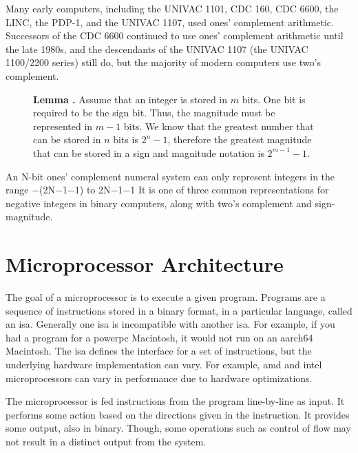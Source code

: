 \documentclass[letterpaper, 12pt]{book}
\newcommand*{\lemma}[1]{\noindent
    \colorbox{green!10}{\noindent
        \begin{minipage}{\textwidth}
            \textbf{Lemma \thechapter.\arabic{examples}}\stepcounter{lemma}
            #1
        \end{minipage}
    }
}
\begin{document}
Many early computers, including the UNIVAC 1101, CDC 160, CDC 6600, the LINC, the PDP-1, and the UNIVAC 1107, used ones' 
complement arithmetic. Successors of the CDC 6600 continued to use ones' complement arithmetic until the late 1980s, and 
the descendants of the UNIVAC 1107 (the UNIVAC 1100/2200 series) still do, but the majority of modern computers use two's 
complement. 

\begin{figure}[ht]
    \lemma{%
        Assume that an integer is stored in $m$ bits. One bit is required to be the sign bit. Thus, the magnitude %
        must be represented in $m - 1$ bits. We know that the greatest number that can be stored in $n$ bits is %
        $2^{n}-1$, therefore the greatest magnitude that can be stored in a sign and magnitude notation is $2^{m-1}-1$.%
    }
\end{figure}

An N-bit ones' complement numeral 
system can only represent integers in the range −(2N−1−1) to 2N−1−1 It is one of three common representations for 
negative integers in binary computers, along with two's complement and sign-magnitude.

\chapter{Microprocessor Architecture}

The goal of a microprocessor is to execute a given program. Programs are a sequence of instructions %
stored in a binary format, in a %
particular language, called an \gls{isa}. Generally one \gls{isa} is incompatible with another \gls{isa}. 
For example, if you had a program for a \gls{powerpc} Macintosh, it would not run on an \gls{aarch64} Macintosh. %
The \gls{isa} defines the interface for a set of instructions, but the underlying hardware implementation 
can vary. For example, \gls{amd} and \gls{intel} microprocessors can vary in performance due to hardware 
optimizations.

The microprocessor is fed %
instructions from the program line-by-line as input. It performs some action based on the directions given in 
the instruction. It provides some output, also in binary. Though, some operations such as \gls{control of flow} 
may not result in a distinct output from the system. %
\end{document}
